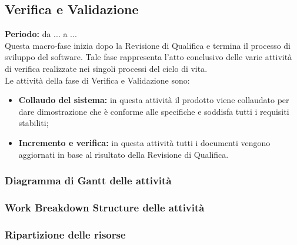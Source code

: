 \subsection{Verifica e Validazione}
	\textbf{Periodo:} da ... a ... \\
	Questa macro-fase inizia dopo la Revisione di Qualifica e termina il processo di sviluppo del software. Tale fase rappresenta l'atto conclusivo delle varie attività di verifica realizzate nei singoli processi del ciclo di vita. \\
	Le attività della fase di Verifica e Validazione sono: \\
	\begin{itemize}
		\item \textbf{Collaudo del sistema:} in questa attività il prodotto viene collaudato per dare
dimostrazione che è conforme alle specifiche e soddisfa tutti i requisiti stabiliti; \\
		\item \textbf{Incremento e verifica:} in questa attività tutti i documenti vengono aggiornati in base al risultato della Revisione di Qualifica. \\
	\end{itemize}
\subsubsection{Diagramma di Gantt delle attività}
\subsubsection{Work Breakdown Structure delle attività}
\subsubsection{Ripartizione delle risorse}